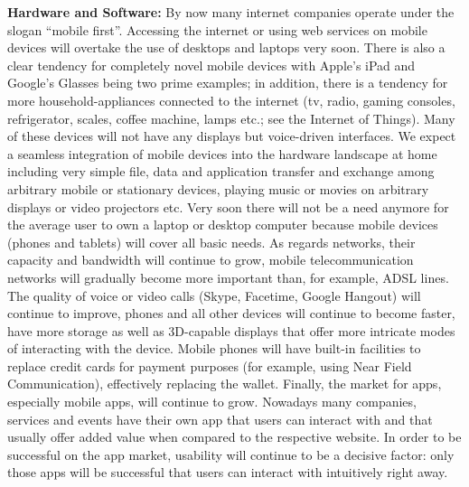 \documentclass[10pt, plain]{../../metanetpaper}
\begin{document}
\begin{multicols}{2}
\textbf{Hardware and Software:} By now many internet companies operate under the slogan ``mobile first''. Accessing the internet or using web services on mobile devices will overtake the use of desktops and laptops very soon. There is also a clear tendency for completely novel mobile devices with Apple's iPad and Google's Glasses being two prime examples; in addition, there is a tendency for more household-appliances connected to the internet (tv, radio, gaming consoles, refrigerator, scales, coffee machine, lamps etc.; see the Internet of Things). Many of these devices will not have any displays but voice-driven interfaces. We expect a seamless integration of mobile devices into the hardware landscape at home including very simple file, data and application transfer and exchange among arbitrary mobile or stationary devices, playing music or movies on arbitrary displays or video projectors etc. Very soon there will not be a need anymore for the average user to own a laptop or desktop computer because mobile devices (phones and tablets) will cover all basic needs. As regards networks, their capacity and bandwidth will continue to grow, mobile telecommunication networks will gradually become more important than, for example, ADSL lines. The quality of voice or video calls (Skype, Facetime, Google Hangout) will continue to improve, phones and all other devices will continue to become faster, have more storage as well as 3D-capable displays that offer more intricate modes of interacting with the device. Mobile phones will have built-in facilities to replace credit cards for payment purposes (for example, using Near Field Communication), effectively replacing the wallet. Finally, the market for apps, especially mobile apps, will continue to grow. Nowadays many companies, services and events have their own app that users can interact with and that usually offer added value when compared to the respective website. In order to be successful on the app market, usability will continue to be a decisive factor: only those apps will be successful that users can interact with intuitively right away.


\end{multicols}
\end{document}
